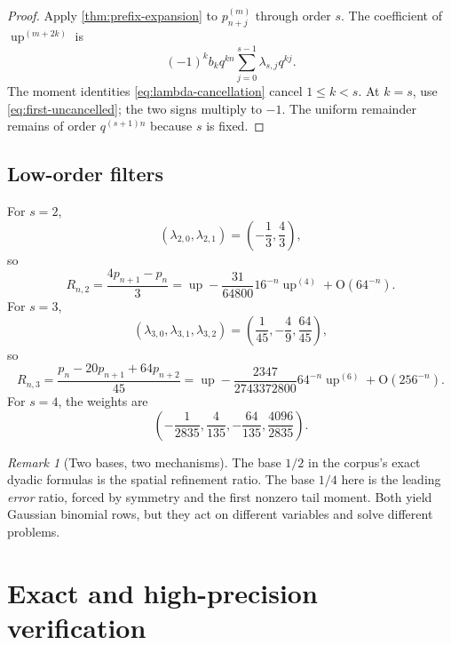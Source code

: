 \documentclass[11pt]{article}
\numberwithin{equation}{section}
\theoremstyle{definition}
\theoremstyle{remark}
\newtheorem{remark}[theorem]{Remark}
\newcommand{\Up}{\operatorname{up}}
\newcommand{\Oh}{\mathrm O}
\begin{document}
\begin{proof}
Apply \cref{thm:prefix-expansion} to $p_{n+j}^{(m)}$ through order $s$.  The coefficient of
\(\Up^{(m+2k)}\) is
\[
 (-1)^kb_kq^{kn}\sum_{j=0}^{s-1}\lambda_{s,j}q^{kj}.
\]
The moment identities \eqref{eq:lambda-cancellation} cancel $1\le k<s$.  At $k=s$, use \eqref{eq:first-uncancelled}; the two signs multiply to $-1$.  The uniform remainder remains of order $q^{(s+1)n}$ because $s$ is fixed.
\end{proof}

\subsection{Low-order filters}

For $s=2$,
\begin{equation}
 (\lambda_{2,0},\lambda_{2,1})=\left(-\frac13,\frac43\right),
 \end{equation}
so
\begin{equation}
 \boxed{
 R_{n,2}=\frac{4p_{n+1}-p_n}{3}
 =\Up-\frac{31}{64800}16^{-n}\Up^{(4)}+\Oh(64^{-n}).}
 \label{eq:Rn2}
\end{equation}
For $s=3$,
\begin{equation}
 (\lambda_{3,0},\lambda_{3,1},\lambda_{3,2})
 =\left(\frac1{45},-\frac49,\frac{64}{45}\right),
\end{equation}
so
\begin{equation}
 \boxed{
 R_{n,3}=\frac{p_n-20p_{n+1}+64p_{n+2}}{45}
 =\Up-\frac{2347}{2743372800}64^{-n}\Up^{(6)}
 +\Oh(256^{-n}).}
 \label{eq:Rn3}
\end{equation}
For $s=4$, the weights are
\begin{equation}
 \left(-\frac1{2835},\frac4{135},-\frac{64}{135},\frac{4096}{2835}\right).
 \label{eq:R4-weights}
\end{equation}

\begin{remark}[Two bases, two mechanisms]
The base $1/2$ in the corpus's exact dyadic formulas is the spatial refinement ratio.  The base $1/4$ here is the leading \emph{error} ratio, forced by symmetry and the first nonzero tail moment.  Both yield Gaussian binomial rows, but they act on different variables and solve different problems.
\end{remark}

\section{Exact and high-precision verification}
\label{sec:verification}
\end{document}
